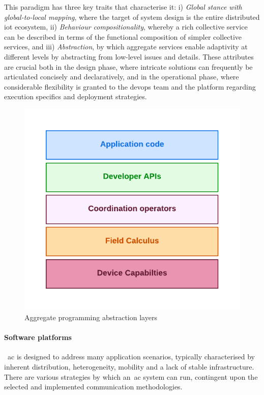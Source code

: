 This paradigm has three key traits that characterise it:
    i) \emph{Global stance with global-to-local mapping}, where the target of system design is the entire distributed
        \ac{iot} ecosystem,
    ii) \emph{Behaviour compositionality}, whereby a rich collective service can be described in terms of the functional
        composition of simpler collective services, and
    iii) \emph{Abstraction}, by which aggregate services enable adaptivity at different levels by abstracting from low-level
        issues and details.
These attributes are crucial both in the design phase, where intricate solutions can frequently be articulated concisely
and declaratively, and in the operational phase, where considerable flexibility is granted to the devops team and the
platform regarding execution specifics and deployment strategies.


\begin{figure}
    \centering
    \includegraphics[width=.8\linewidth]{figures/AC-layers}
    \caption{Aggregate programming abstraction layers}
    \label{fig:ac-layers}
\end{figure}

\paragraph{Software platforms}
~\ac{ac} is designed to address many application scenarios, typically characterised by inherent distribution, heterogeneity,
mobility and a lack of stable infrastructure.
There are various strategies by which an~\ac{ac} system can run, contingent upon the selected and implemented
communication methodologies.

